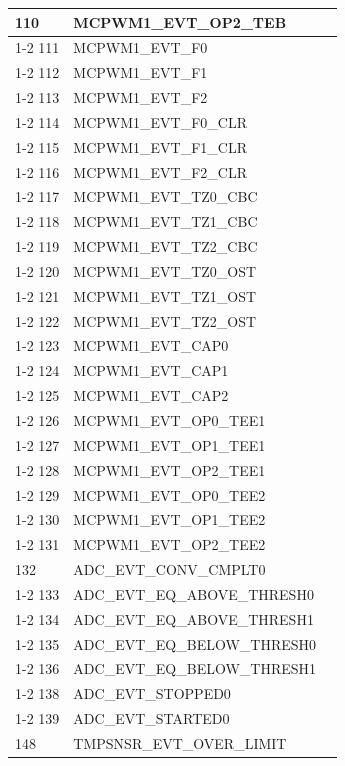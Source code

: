 \documentclass[main\_\_EN.tex]{subfiles}
\begin{document}
\begin{longtable}{ | l | l | l | }
110  & MCPWM1\_EVT\_OP2\_TEB & \\ \cline{1-2}
111  & MCPWM1\_EVT\_F0     & \\ \cline{1-2}
112  & MCPWM1\_EVT\_F1     & \\ \cline{1-2}
113  & MCPWM1\_EVT\_F2     & \\ \cline{1-2}
114  & MCPWM1\_EVT\_F0\_CLR  & \\ \cline{1-2}
115  & MCPWM1\_EVT\_F1\_CLR  & \\ \cline{1-2}
116  & MCPWM1\_EVT\_F2\_CLR  & \\ \cline{1-2}
117  & MCPWM1\_EVT\_TZ0\_CBC & \\ \cline{1-2}
118  & MCPWM1\_EVT\_TZ1\_CBC & \\ \cline{1-2}
119  & MCPWM1\_EVT\_TZ2\_CBC & \\ \cline{1-2}
120  & MCPWM1\_EVT\_TZ0\_OST & \\ \cline{1-2}
121  & MCPWM1\_EVT\_TZ1\_OST & \\ \cline{1-2}
122  & MCPWM1\_EVT\_TZ2\_OST & \\ \cline{1-2}
123  & MCPWM1\_EVT\_CAP0   & \\ \cline{1-2}
124  & MCPWM1\_EVT\_CAP1   & \\ \cline{1-2}
125  & MCPWM1\_EVT\_CAP2   & \\ \cline{1-2}
126  & MCPWM1\_EVT\_OP0\_TEE1   & \\ \cline{1-2}
127  & MCPWM1\_EVT\_OP1\_TEE1   & \\ \cline{1-2}
128  & MCPWM1\_EVT\_OP2\_TEE1   & \\ \cline{1-2}
129  & MCPWM1\_EVT\_OP0\_TEE2   & \\ \cline{1-2}
130  & MCPWM1\_EVT\_OP1\_TEE2   & \\ \cline{1-2}
131  & MCPWM1\_EVT\_OP2\_TEE2   & \\ \hline
132  & ADC\_EVT\_CONV\_CMPLT0    & \nameref{mod:adc}   \\ \cline{1-2}
133  & ADC\_EVT\_EQ\_ABOVE\_THRESH0     & \\ \cline{1-2}
134  & ADC\_EVT\_EQ\_ABOVE\_THRESH1     & \\ \cline{1-2}
135  & ADC\_EVT\_EQ\_BELOW\_THRESH0     & \\ \cline{1-2}
136  & ADC\_EVT\_EQ\_BELOW\_THRESH1     & \\ \cline{1-2}
138  & ADC\_EVT\_STOPPED0 & \\ \cline{1-2}
139  & ADC\_EVT\_STARTED0 & \\ \hline
148 & TMPSNSR\_EVT\_OVER\_LIMIT & \nameref{mod:tmpsen}  \\ \hline

\end{longtable}
\end{document}
